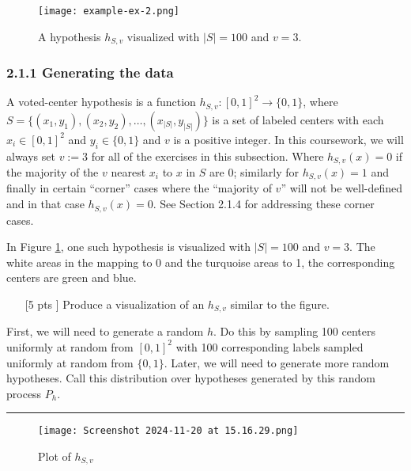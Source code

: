 \documentclass{article}
\begin{document}
\begin{figure}[H]
    \centering
    \texttt{[image: example-ex-2.png]}
    \caption{A hypothesis $h_{S,v}$ visualized with $|S| = 100$ and $v = 3$.}
    \label{partII}
\end{figure}

\subsubsection*{2.1.1 Generating the data}

A voted-center hypothesis is a function $h_{S,v}: [0,1]^2 \to \{0,1\}$, where $S = \{(x_1, y_1), (x_2, y_2), \ldots, (x_{|S|}, y_{|S|})\}$ is a set of labeled centers with each $x_i \in [0,1]^2$ and $y_i \in \{0,1\}$ and $v$ is a positive integer. In this coursework, we will always set $v := 3$ for all of the exercises in this subsection. Where $h_{S,v}(x) = 0$ if the majority of the $v$ nearest $x_i$ to $x$ in $S$ are 0; similarly for $h_{S,v}(x) = 1$ and finally in certain ``corner'' cases where the ``majority of $v$'' will not be well-defined and in that case $h_{S,v}(x) = 0$. See Section 2.1.4 for addressing these corner cases.

In Figure \ref{partII}, one such hypothesis is visualized with $|S| = 100$ and $v = 3$. The white areas in the mapping to 0 and the turquoise areas to 1, the corresponding centers are green and blue.

\begin{enumerate}
    \item [[5 pts]] Produce a visualization of an $h_{S,v}$ similar to the figure.
\end{enumerate}

First, we will need to generate a random $h$. Do this by sampling 100 centers uniformly at random from $[0,1]^2$ with 100 corresponding labels sampled uniformly at random from $\{0,1\}$. Later, we will need to generate more random hypotheses. Call this distribution over hypotheses generated by this random process $P_h$.

\noindent\textcolor{gray}{\rule{0.1\linewidth}{0.5pt}}

\vspace{15pt}


\begin{figure}[H]
    \centering
    \texttt{[image: Screenshot 2024-11-20 at 15.16.29.png]}
    \caption{Plot of $h_{S,v}$}
    \label{fig:enter-label}
\end{figure}
\end{document}
